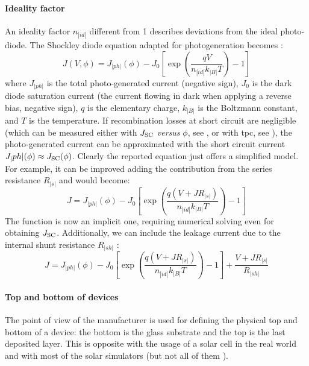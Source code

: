 		\paragraph{Ideality factor} An ideality factor $n_|id|$ different from 1 describes deviations from the ideal photo-diode.
		The Shockley diode equation adapted for photogeneration becomes \cite{Calado2018b}:
		\begin{equation} \label{eq:photodiode}
			J(V,\phi) = J_|ph|(\phi) - J_0\left[\exp(\frac{qV}{n_|id|k_|B|T})-1\right]
		\end{equation}
		where $J_|ph|$ is the total photo\hyp{}generated current (negative sign), $J_0$ is the dark diode saturation current (the current flowing in dark when applying a reverse bias, negative sign), $q$ is the elementary charge, $k_|B|$ is the Boltzmann constant, and $T$ is the temperature.
		If recombination losses at short circuit are negligible (which can be measured either with $J_\mathrm{SC}$ \textsl{versus} $\phi$, see , or with \gls{tpc}, see ), the photo\hyp{}generated current can be approximated with the short circuit current $J_|ph|(\phi) \approx J_\mathrm{SC}(\phi)$.
		Clearly the reported equation just offers a simplified model.
		For example, it can be improved adding the contribution from the series resistance $R_|s|$ and would become:
		\begin{equation}\label{eq:series_resistance}
			J = J_|ph|(\phi) - J_0\left[\exp(\frac{q(V+JR_|s|)}{n_|id|k_|B|T})-1\right]
		\end{equation}
		The function is now an implicit one, requiring numerical solving even for obtaining $J_\mathrm{SC}$.
		Additionally, we can include the leakage current due to the internal shunt resistance $R_|sh|$ \cite{Nelson2003}:
		\begin{equation}
			J = J_|ph|(\phi) - J_0\left[\exp(\frac{q(V+JR_|s|)}{n_|id|k_|B|T})-1\right] + \frac{V+JR_|s|}{R_|sh|}
		\end{equation}

		\paragraph{Top and bottom of devices} The point of view of the manufacturer is used for defining the physical top and bottom of a device: the bottom is the glass substrate and the top is the last deposited layer.
		This is opposite with the usage of a solar cell in the real world and with most of the solar simulators (but not all of them
		\cite{Fluxim}).

